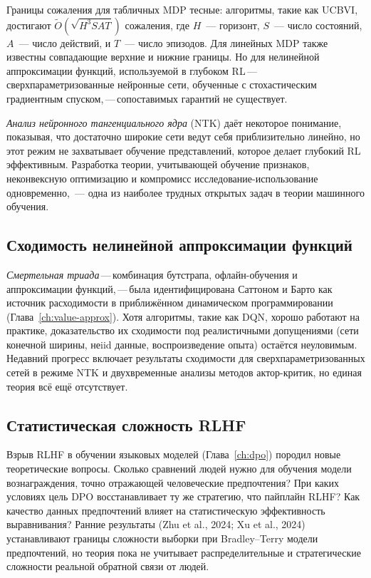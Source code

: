 Границы сожаления для табличных MDP тесные: алгоритмы, такие как UCBVI,
достигают $\tilde{O}(\sqrt{H^3 S A T})$ сожаления, где $H$~---
горизонт, $S$~--- число состояний, $A$~--- число действий, и $T$~---
число эпизодов. Для линейных MDP также известны совпадающие верхние и нижние
границы. Но для нелинейной аппроксимации функций,
используемой в глубоком RL\,---\,сверхпараметризованные нейронные сети, обученные с
стохастическим градиентным спуском,\,---\,сопоставимых гарантий не существует.

\emph{Анализ нейронного тангенциального ядра} (NTK) даёт некоторое понимание,
показывая, что достаточно широкие сети ведут себя приблизительно линейно,
но этот режим не захватывает обучение представлений, которое
делает глубокий RL эффективным. Разработка теории, учитывающей
обучение признаков, неконвексную оптимизацию и компромисс
исследование-использование одновременно,~--- одна из наиболее трудных открытых задач
в теории машинного обучения.

\subsection{Сходимость нелинейной аппроксимации функций}

\emph{Смертельная триада}\,---\,комбинация бутстрапа,
офлайн-обучения и аппроксимации функций,\,---\,была идентифицирована
Саттоном и Барто как источник расходимости в приближённом динамическом
программировании (Глава~\ref{ch:value-approx}). Хотя алгоритмы, такие
как DQN, хорошо работают на практике, доказательство их сходимости под
реалистичными допущениями (сети конечной ширины, неiid данные,
воспроизведение опыта) остаётся неуловимым. Недавний прогресс включает
результаты сходимости для сверхпараметризованных сетей в режиме NTK
и двухвременные анализы методов актор-критик, но единая
теория всё ещё отсутствует.

\subsection{Статистическая сложность RLHF}

Взрыв RLHF в обучении языковых моделей
(Глава~\ref{ch:dpo}) породил новые теоретические вопросы. Сколько
сравнений людей нужно для обучения модели вознаграждения, точно
отражающей человеческие предпочтения? При каких условиях цель DPO восстанавливает ту же стратегию, что пайплайн RLHF? Как
качество данных предпочтений влияет на статистическую
эффективность выравнивания? Ранние результаты (Zhu et al., 2024; Xu et al.,
2024) устанавливают границы сложности выборки при
Bradley--Terry модели предпочтений, но
теория пока не учитывает распределительные и стратегические
сложности реальной обратной связи от людей.

